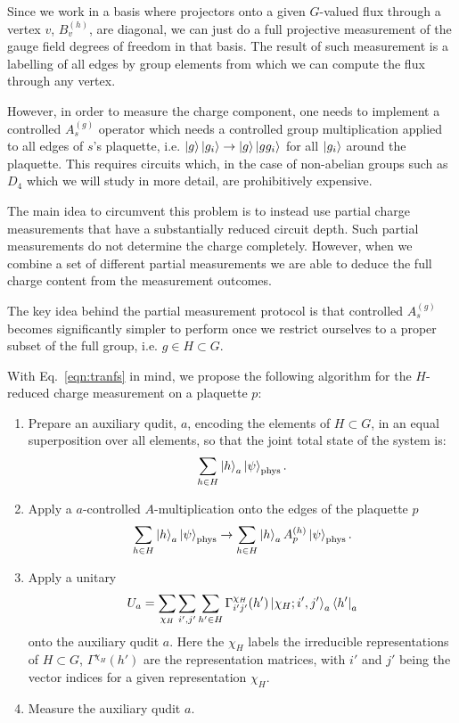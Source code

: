 \documentclass[two column]{article}
\begin{document}
Since we work in a basis where projectors onto a given $G$-valued flux through a vertex $v$, $B_v^{(h)}$, are diagonal, we can just do a full projective measurement of the gauge field degrees of freedom in that basis. 
The result of such measurement is a labelling of all edges by group elements from which we can compute the flux through any vertex. 

However, in order to measure the charge component, one needs to implement a controlled $A^{(g)}_s$ operator which needs a controlled group multiplication applied to all edges of $s$'s plaquette, i.e. $\ket{g}\ket{g_i} \rightarrow \ket{g}\ket{gg_i}$ for all $\ket{g_i}$ around the plaquette.
This requires circuits which, in the case of non-abelian groups such as $D_4$ which we will study in more detail, are prohibitively expensive. 

The main idea to circumvent this problem is to instead use partial charge measurements that have a substantially reduced circuit depth. Such partial measurements do not determine the charge completely. However, when we combine a set of different partial measurements we are able to deduce the full charge content from the measurement outcomes.

The key idea behind the partial measurement protocol is that controlled $A_s^{(g)}$ becomes significantly simpler to perform once we restrict ourselves to a proper subset of the full group, i.e. $g \in H \subset G$.

With Eq.~\eqref{eqn:tranfs} in mind, we propose the following algorithm for the $H$-reduced charge measurement on a plaquette $p$:\begin{enumerate}
    \item Prepare an auxiliary qudit, $a$, encoding the elements of $H\subset G$, in an equal superposition over all elements, so that the joint total state of the system is: $$ \sum_{h \in H} \ket{h}_a\ket{\psi}_\text{phys}. $$
    \item Apply a $a$-controlled $A$-multiplication onto the edges of the plaquette $p$$$ \sum_{h \in H} \ket{h}_a\ket{\psi}_\text{phys} \rightarrow \sum_{h \in H} \ket{h}_a A^{(h)}_p \ket{\psi}_\text{phys}. $$
    \item Apply a unitary $$ U_a = \sum_{\chi_H}\sum_{i', j'}\sum_{h'\in H}  \Gamma^{\chi_H}_{i'j'}(h')  \ket{\chi_H; i', j'}_a\bra{h'}_a $$ onto the auxiliary qudit $a$. Here the $\chi_H$ labels the irreducible representations of $H \subset G$, $\Gamma^{\chi_H}(h')$ are the representation matrices, with $i'$ and $j'$ being the vector indices for a given representation $\chi_H$.
    \item Measure the auxiliary qudit $a$.
\end{enumerate}
\end{document}
